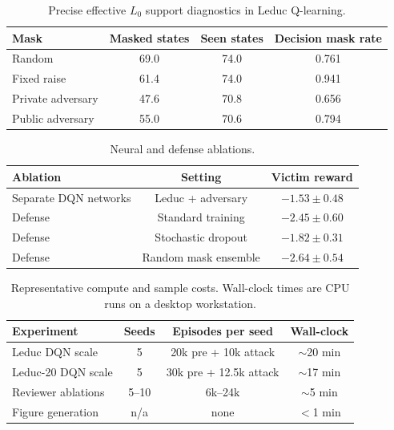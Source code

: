 \documentclass{article}
\begin{document}
\begin{table}[ht]
\centering
\caption{Precise effective $L_0$ support diagnostics in Leduc Q-learning.}
\begin{tabular}{lccc}
\toprule
Mask & Masked states & Seen states & Decision mask rate \\
\midrule
Random & 69.0 & 74.0 & 0.761 \\
Fixed raise & 61.4 & 74.0 & 0.941 \\
Private adversary & 47.6 & 70.8 & 0.656 \\
Public adversary & 55.0 & 70.6 & 0.794 \\
\bottomrule
\end{tabular}
\end{table}

\begin{table}[ht]
\centering
\caption{Neural and defense ablations.}
\begin{tabular}{lcc}
\toprule
Ablation & Setting & Victim reward \\
\midrule
Separate DQN networks & Leduc + adversary & $-1.53 \pm 0.48$ \\
Defense & Standard training & $-2.45 \pm 0.60$ \\
Defense & Stochastic dropout & $-1.82 \pm 0.31$ \\
Defense & Random mask ensemble & $-2.64 \pm 0.54$ \\
\bottomrule
\end{tabular}
\end{table}

\begin{table}[ht]
\centering
\caption{Representative compute and sample costs. Wall-clock times are CPU runs on a desktop workstation.}
\begin{tabular}{lccc}
\toprule
Experiment & Seeds & Episodes per seed & Wall-clock \\
\midrule
Leduc DQN scale & 5 & 20k pre + 10k attack & $\sim$20 min \\
Leduc-20 DQN scale & 5 & 30k pre + 12.5k attack & $\sim$17 min \\
Reviewer ablations & 5--10 & 6k--24k & $\sim$5 min \\
Figure generation & n/a & none & $<$1 min \\
\bottomrule
\end{tabular}
\end{table}
\end{document}
